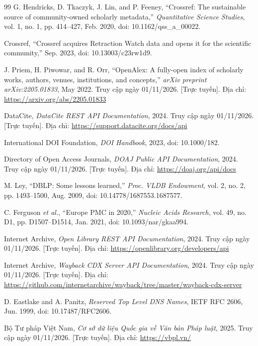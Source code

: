 \begin{thebibliography}{99}
G. Hendricks, D. Tkaczyk, J. Lin, and P. Feeney, ``Crossref: The sustainable source of community-owned scholarly metadata,'' \textit{Quantitative Science Studies}, vol. 1, no. 1, pp. 414--427, Feb. 2020, doi: 10.1162/qss\_a\_00022.

Crossref, ``Crossref acquires Retraction Watch data and opens it for the scientific community,'' Sep. 2023, doi: 10.13003/c23rw1d9.

J. Priem, H. Piwowar, and R. Orr, ``OpenAlex: A fully-open index of scholarly works, authors, venues, institutions, and concepts,'' \textit{arXiv preprint arXiv:2205.01833}, May 2022. Truy cập ngày 01/11/2026. [Trực tuyến]. Địa chỉ: \url{https://arxiv.org/abs/2205.01833}

DataCite, \textit{DataCite REST API Documentation}, 2024. Truy cập ngày 01/11/2026. [Trực tuyến]. Địa chỉ: \url{https://support.datacite.org/docs/api}

International DOI Foundation, \textit{DOI Handbook}, 2023, doi: 10.1000/182.

Directory of Open Access Journals, \textit{DOAJ Public API Documentation}, 2024. Truy cập ngày 01/11/2026. [Trực tuyến]. Địa chỉ: \url{https://doaj.org/api/docs}

M. Ley, ``DBLP: Some lessons learned,'' \textit{Proc. VLDB Endowment}, vol. 2, no. 2, pp. 1493--1500, Aug. 2009, doi: 10.14778/1687553.1687577.

C. Ferguson \textit{et al.}, ``Europe PMC in 2020,'' \textit{Nucleic Acids Research}, vol. 49, no. D1, pp. D1507--D1514, Jan. 2021, doi: 10.1093/nar/gkaa994.

Internet Archive, \textit{Open Library REST API Documentation}, 2024. Truy cập ngày 01/11/2026. [Trực tuyến]. Địa chỉ: \url{https://openlibrary.org/developers/api}

Internet Archive, \textit{Wayback CDX Server API Documentation}, 2024. Truy cập ngày 01/11/2026. [Trực tuyến]. Địa chỉ: \url{https://github.com/internetarchive/wayback/tree/master/wayback-cdx-server}

D. Eastlake and A. Panitz, \textit{Reserved Top Level DNS Names}, IETF RFC 2606, Jun. 1999, doi: 10.17487/RFC2606.

Bộ Tư pháp Việt Nam, \textit{Cơ sở dữ liệu Quốc gia về Văn bản Pháp luật}, 2025. Truy cập ngày 01/11/2026. [Trực tuyến]. Địa chỉ: \url{https://vbpl.vn/}


\end{thebibliography}
